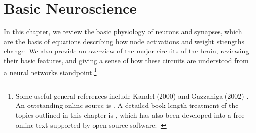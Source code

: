 \chapter{Basic Neuroscience}\label{ch_neuro}




In this chapter, we review the basic physiology of neurons and synapses, which are the basis of equations describing how node activations and weight strengths change. We also provide an overview of the major circuits of the brain, reviewing their basic features, and giving a sense of how these circuits are understood from a neural networks standpoint.\footnote{Some useful general references include Kandel (2000) \cite{kandel2000principles} and Gazzaniga (2002) \cite{gazzaniga2002cognitive}. An outstanding online source is . A detailed book-length treatment of the topics outlined in this chapter is \cite{cecn_4e}, which has also been developed into a free online text supported by open-source software: .}  

